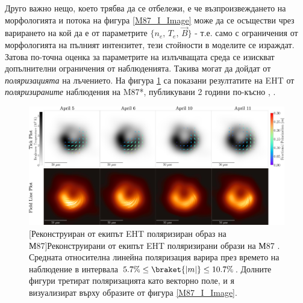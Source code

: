 Друго важно нещо, което трябва да се отбележи, е че възпроизвеждането на морфологията и потока на фигура \ref{M87_I_Image} може да се осъществи чрез варирането на кой да е от параметрите $\{n_{e},\,T_{e},\, \vec{B}\}$ \cite{EHT_M87_V} - т.е. само с ограничения от морфологията на пълният интензитет, тези стойности в моделите се израждат. Затова по-точна оценка за параметрите на излъчващата среда се изискват допълнителни ограничения от наблюденията. Такива могат да дойдат от \emph{поляризацията} на лъчението. На фигура \ref{M87_Pol_Image} са показани резултатите на EHT от \emph{поляризираните} наблюдения на M87*, публикувани 2 години по-късно \cite{EHT_M87_VII}, \cite{EHT_M87_VIII}.\\

 \begin{figure}[h!]{
 \centering
 \includegraphics[scale = 0.8]{M87_Polarization_overlay.jpg}\newline
 [Реконструиран от екипът EHT поляризиран образ на М87]{\small Реконструирани от екипът EHT поляризирани образи на М87 \cite{EHT_M87_VII}. Средната относителна линейна поляризация варира през времето на наблюдение в интервала $5.7\% \le \braket{|m|} \le 10.7\%$. Долните фигури третират поляризацията като векторно поле, и я визуализират върху образите от фигура \ref{M87_I_Image}.} 
 \label{M87_Pol_Image}}
 \end{figure}
 
